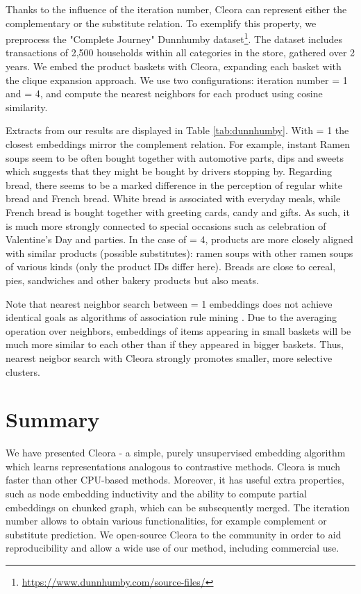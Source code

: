 \documentclass{IEEEtran}
\begin{document}
Thanks to the influence of the iteration number, Cleora can represent either the complementary or the substitute relation. To exemplify this property, we preprocess the "Complete Journey" Dunnhumby dataset\footnote{\url{https://www.dunnhumby.com/source-files/}}. The dataset includes transactions of 2,500 households within all categories in the store, gathered over 2 years. We embed the product baskets with Cleora, expanding each basket with the clique expansion approach. We use two configurations: iteration number  = 1 and  = 4, and compute the nearest neighbors for each product using cosine similarity.

Extracts from our results are displayed in Table \ref{tab:dunnhumby}. With  = 1 the closest embeddings mirror the complement relation. For example, instant Ramen soups seem to be often bought together with automotive parts, dips and sweets which suggests that they might be bought by drivers stopping by. Regarding bread, there seems to be a marked difference in the perception of regular white bread and French bread. White bread is associated with everyday meals, while French bread is bought together with greeting cards, candy and gifts. As such, it is much more strongly connected to special occasions such as celebration of Valentine's Day and parties. In the case of  = 4, products are more closely aligned with similar products (possible substitutes): ramen soups with other ramen soups of various kinds (only the product IDs differ here). Breads are close to cereal, pies, sandwiches and other bakery products but also meats.

Note that nearest neighbor search between  = 1 embeddings does not achieve identical goals as algorithms of association rule mining \cite{agrawal1993mining, agarwal1994fast, grahne2003efficiently}. Due to the averaging operation over neighbors, embeddings of items appearing in small baskets will be much more similar to each other than if they appeared in bigger baskets. Thus, nearest neigbor search with Cleora strongly promotes smaller, more selective clusters.


\section{Summary}

We have presented Cleora - a simple, purely unsupervised embedding algorithm which learns representations analogous to contrastive methods. Cleora is much faster than other CPU-based methods. Moreover, it has useful extra properties, such as node embedding inductivity and the ability to compute partial embeddings on chunked graph, which can be subsequently merged. The iteration number allows to obtain various functionalities, for example complement or substitute prediction. We open-source Cleora to the community in order to aid reproducibility and allow a wide use of our method, including commercial use.
\end{document}
